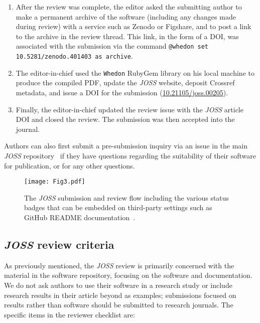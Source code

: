 \documentclass{article}
\newcommand\joss{\textit{JOSS}}
\begin{document}
\begin{enumerate}
\item After the review was complete, the editor asked the submitting author to make a permanent archive of the software (including any changes made during review) with a service such as Zenodo or Figshare, and to post a link to the archive in the review thread. This link, in the form of a DOI, was associated with the submission via the command \texttt{@whedon set 10.5281/zenodo.401403 as archive}.

\item The editor-in-chief used the \texttt{Whedon} RubyGem library on his local machine to produce the compiled PDF, update the \joss{} website, deposit Crossref metadata, and issue a DOI for the submission (\href{https://doi.org/10.21105/joss.00205}{10.21105/joss.00205}).

\item Finally, the editor-in-chief updated the review issue with the \joss{} article DOI and closed the review. The submission was then accepted into the journal.

\end{enumerate}

Authors can also first submit a pre-submission inquiry via an issue in the main \joss{} repository~\cite{joss-site} if they have questions regarding the suitability of their software for publication, or for any other questions.

\begin{figure}[htp]
\centering
\texttt{[image: Fig3.pdf]}
\caption{The \joss{} submission and review flow including the various status badges that can be embedded on third-party settings such as GitHub README documentation~\cite{JOSS-publication-workflow}.
\label{fig:submission-flow}}
\end{figure}



\subsection{\joss{} review criteria}\label{review-details}

As previously mentioned, the \joss{} review is primarily concerned with the material
in the software repository, focusing on the software and documentation.
We do not ask authors to use their software in a research study or include research results in their article beyond as examples; submissions focused on results rather than software should be submitted to research journals.
The specific items in the reviewer checklist are:
\end{document}
